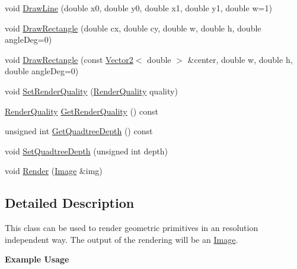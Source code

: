 \begin{DoxyCompactItemize}
\item 
void \hyperlink{classastu_1_1ImageRenderer_ae9e54c2f75cc76b9d45216df81b92aa4}{Draw\+Line} (double x0, double y0, double x1, double y1, double w=1)
\item 
void \hyperlink{classastu_1_1ImageRenderer_a95ed0bcec030e0ab17d0c6abc104eac3}{Draw\+Rectangle} (double cx, double cy, double w, double h, double angle\+Deg=0)
\item 
void \hyperlink{classastu_1_1ImageRenderer_a43f82202ac8ffdeba33fd5ecc600c267}{Draw\+Rectangle} (const \hyperlink{classastu_1_1Vector2}{Vector2}$<$ double $>$ \&center, double w, double h, double angle\+Deg=0)
\item 
void \hyperlink{classastu_1_1ImageRenderer_a154491f8ef39881eeaba56f9d8ca24e8}{Set\+Render\+Quality} (\hyperlink{group__gfx__group_gac3b4955f341cea44f53f8446d734cd54}{Render\+Quality} quality)
\item 
\hyperlink{group__gfx__group_gac3b4955f341cea44f53f8446d734cd54}{Render\+Quality} \hyperlink{classastu_1_1ImageRenderer_a7f3f1cc8129dd8e40dea73e7f1333769}{Get\+Render\+Quality} () const
\item 
unsigned int \hyperlink{classastu_1_1ImageRenderer_ad08e4f2afcf5076aa6745557914f77ce}{Get\+Quadtree\+Depth} () const
\item 
void \hyperlink{classastu_1_1ImageRenderer_af40c3c01ee3928fb7a8be816afe20eb5}{Set\+Quadtree\+Depth} (unsigned int depth)
\item 
void \hyperlink{classastu_1_1ImageRenderer_a55172edcac396d7840da655697d57e28}{Render} (\hyperlink{classastu_1_1Image}{Image} \&img)
\end{DoxyCompactItemize}


\subsection{Detailed Description}
This class can be used to render geometric primitives in an resolution independent way. The output of the rendering will be an \hyperlink{classastu_1_1Image}{Image}.

{\bfseries Example Usage}


